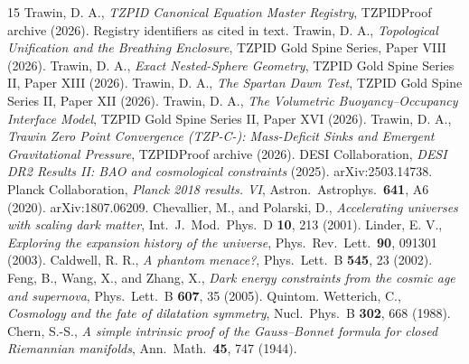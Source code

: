 \documentclass[11pt]{article}
\theoremstyle{remark}
\begin{document}
\begin{thebibliography}{15}
 Trawin, D. A., \emph{TZPID Canonical Equation Master Registry}, TZPIDProof archive (2026). Registry identifiers as cited in text.
 Trawin, D. A., \emph{Topological Unification and the Breathing Enclosure}, TZPID Gold Spine Series, Paper VIII (2026).
 Trawin, D. A., \emph{Exact Nested-Sphere Geometry}, TZPID Gold Spine Series II, Paper XIII (2026).
 Trawin, D. A., \emph{The Spartan Dawn Test}, TZPID Gold Spine Series II, Paper XII (2026).
 Trawin, D. A., \emph{The Volumetric Buoyancy--Occupancy Interface Model}, TZPID Gold Spine Series II, Paper XVI (2026).
 Trawin, D. A., \emph{Trawin Zero Point Convergence (TZP-C-): Mass-Deficit Sinks and Emergent Gravitational Pressure}, TZPIDProof archive (2026).
 DESI Collaboration, \emph{DESI DR2 Results II: BAO and cosmological constraints} (2025). arXiv:2503.14738.
 Planck Collaboration, \emph{Planck 2018 results. VI}, Astron.\ Astrophys.\ \textbf{641}, A6 (2020). arXiv:1807.06209.
 Chevallier, M., and Polarski, D., \emph{Accelerating universes with scaling dark matter}, Int.\ J.\ Mod.\ Phys.\ D \textbf{10}, 213 (2001).
 Linder, E. V., \emph{Exploring the expansion history of the universe}, Phys.\ Rev.\ Lett.\ \textbf{90}, 091301 (2003).
 Caldwell, R. R., \emph{A phantom menace?}, Phys.\ Lett.\ B \textbf{545}, 23 (2002).
 Feng, B., Wang, X., and Zhang, X., \emph{Dark energy constraints from the cosmic age and supernova}, Phys.\ Lett.\ B \textbf{607}, 35 (2005). Quintom.
 Wetterich, C., \emph{Cosmology and the fate of dilatation symmetry}, Nucl.\ Phys.\ B \textbf{302}, 668 (1988).
 Chern, S.-S., \emph{A simple intrinsic proof of the Gauss--Bonnet formula for closed Riemannian manifolds}, Ann.\ Math.\ \textbf{45}, 747 (1944).
\end{thebibliography}
\end{document}

